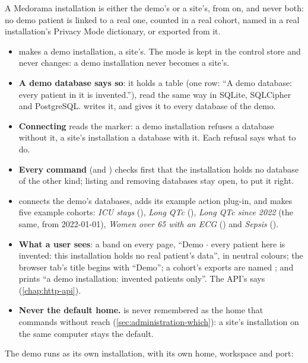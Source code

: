 A Medorama installation is either the demo's or a site's, from  on, and never
both: no demo patient is linked to a real one, counted in a real cohort, named in a real
installation's Privacy Mode dictionary, or exported from it.
\begin{itemize}
\item {} makes a demo installation,  a site's. The
  mode is kept in the control store and never changes: a demo installation never becomes a
  site's.
\item \textbf{A demo database says so}: it holds a table  (one row: ``A demo
  database: every patient in it is invented.''), read the same way in SQLite, SQLCipher and
  PostgreSQL.  writes it, and  gives it
  to every database of the demo.
\item \textbf{Connecting} reads the marker: a demo installation refuses a database without it,
  a site's installation a database with it. Each refusal says what to do.
\item \textbf{Every command} (and ) checks first that the installation holds
  no database of the other kind; listing and removing databases stay open, to put it right.
\item {} connects the demo's databases, adds its example action plug-in, and
  makes five example cohorts: \emph{ICU stays} (), \emph{Long QTc}
  (), \emph{Long QTc since 2022} (the same, from 2022-01-01),
  \emph{Women over 65 with an ECG} () and \emph{Sepsis} ().
\item \textbf{What a user sees}: a band on every page, ``Demo $\cdot$ every patient here is
  invented: this installation holds no real patient's data'', in neutral colours; the browser
  tab's title begins with ``Demo''; a cohort's exports are named ; and
   prints ``a demo installation: invented patients only''. The API's
   says  (\cref{chap:http-api}).
\item \textbf{Never the default home.}  is never remembered as the home that
  commands without  reach (\cref{sec:administration-which}): a site's installation
  on the same computer stays the default.
\end{itemize}
The demo runs as its own installation, with its own home, workspace and port:
